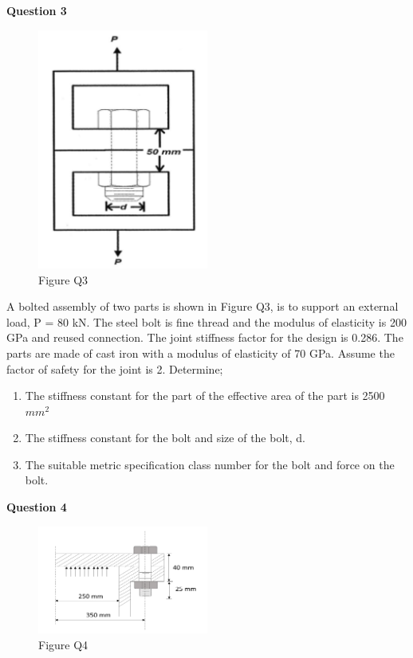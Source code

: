 \documentclass[a4paper, fleqn]{article}
\begin{document}
\newpage
\textbf{Question 3}

\begin{figure}[h]
    \centering
    \includegraphics[width=0.5\textwidth]{t31-q3.png}
    \caption{Figure Q3}
\end{figure}

A bolted assembly of two parts is shown in Figure Q3, is to support an external load, P = 80 kN. The steel bolt is fine thread and the modulus of elasticity is 200 GPa and reused connection. The joint stiffness factor for the design is 0.286. The parts are made of cast iron with a modulus of elasticity of 70 GPa. Assume the factor of safety for the joint is 2. Determine;

\begin{enumerate}[label=(\roman*)]
    \item The stiffness constant for the part of the effective area of the part is 2500 $mm^2$
    \item The stiffness constant for the bolt and size of the bolt, d.
    \item The suitable metric specification class number for the bolt and force on the bolt.
\end{enumerate}


\newpage
\textbf{Question 4}

\begin{figure}[h]
    \centering
    \includegraphics[width=0.5\textwidth]{t31-q4.png}
    \caption{Figure Q4}
\end{figure}
\end{document}
